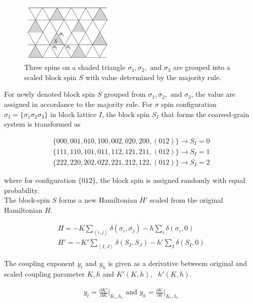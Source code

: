 \documentclass[%
 reprint,
 amsmath,amssymb,
 aps,
]{revtex4-2}
\begin{document}
\begin{figure}[b]
\includegraphics[width=0.4\textwidth]{../fig/triangular lattice.JPG}
\caption{\label{fig:tri} Three spins on a shaded triangle $\sigma_{1}, \sigma_{2}, 
\text{ and } \sigma_{3}$ are grouped into a scaled block spin $S$ with value determined
by the majority rule.}
\end{figure}

For newly denoted block spin $S$ grouped from $\sigma_{1}, \sigma_{2}, \text{ and } 
\sigma_{3}$, the value are assigned in accordance to the majority rule. For $\sigma$
spin configuration $\sigma_{I} = \{\sigma_{1}\sigma_{2}\sigma_{3}\}$ in block lattice $I$, 
the block spin $S_{I}$ that forms the coarsed-grain system is transformed as

\begin{gather}
\{000, 001, 010, 100, 002, 020, 200, (012) \} \rightarrow S_{I}=0 \\
\{111, 110, 101, 011, 112, 121, 211, (012) \} \rightarrow S_{I}=1 \\
\{222, 220, 202, 022, 221, 212, 122, (012) \} \rightarrow S_{I}=2
\end{gather}

where for configuration $\{012\}$, the block spin is assigned randomly with equal 
probability. \\

The block-spin $S$ forms a new Hamiltonian $H'$ scaled from the original Hamiltonian $H$.

\begin{gather}
H = -K\sum_{\left<i,j\right>}\delta(\sigma_{i}, \sigma_{j}) -h\sum_{i}\delta(\sigma_{i},0) \\
H'= -K'\sum_{\left<I,J\right>}\delta(S_{I}, S_{J}) -h'\sum_{I}\delta(S_{I},0) \label{eqn:Hpri}
\end{gather}

The coupling exponent $y_t \text{ and } y_h$ is given as a derivative betweem original and 
scaled coupling parameter $K, h$ and $K'(K,h), \text{ } h'(K,h)$.

\begin{eqnarray}
y_{t} = \frac{\partial K'}{\partial K}\bigg|_{K_c,h_c} \text{ and } 
y_{h} = \frac{\partial h'}{\partial h}\bigg|_{K_c,h_c} \label{eqn:exp} \\
\end{eqnarray}
\end{document}
